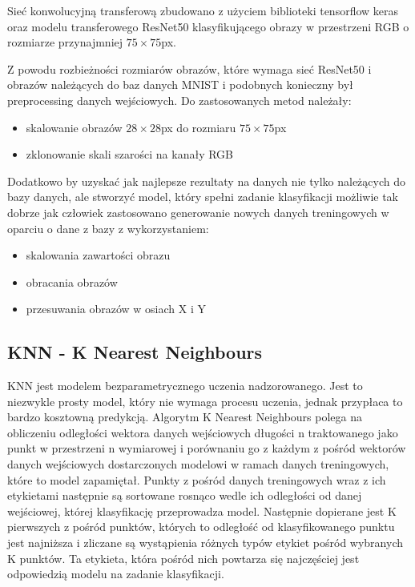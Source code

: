 \documentclass{article}
\begin{document}
Sieć konwolucyjną transferową zbudowano z użyciem biblioteki tensorflow 
keras oraz modelu transferowego ResNet50 klasyfikującego obrazy w 
przestrzeni RGB o rozmiarze przynajmniej $75\times75$px.

Z powodu rozbieżności rozmiarów obrazów, które wymaga sieć ResNet50 
i obrazów należących do baz danych MNIST i podobnych konieczny był 
preprocessing danych wejściowych. Do zastosowanych metod należały:

\begin{itemize}
\item skalowanie obrazów $28\times28$px do rozmiaru $75\times75$px
\item zklonowanie skali szarości na kanały RGB 
\end{itemize}

Dodatkowo by uzyskać jak najlepsze rezultaty na danych nie tylko 
należących do bazy danych, ale stworzyć model, który spełni zadanie 
klasyfikacji możliwie tak dobrze jak człowiek zastosowano 
generowanie nowych danych treningowych w oparciu o dane z bazy z wykorzystaniem:

\begin{itemize}
\item skalowania zawartości obrazu
\item obracania obrazów
\item przesuwania obrazów w osiach X i Y
\end{itemize}


\subsection{KNN - K Nearest Neighbours}
KNN jest modelem bezparametrycznego uczenia nadzorowanego. Jest to niezwykle prosty model,
 który nie wymaga procesu uczenia, jednak przypłaca to bardzo kosztowną predykcją.
Algorytm K Nearest Neighbours polega na obliczeniu odległości wektora danych wejściowych 
długości n traktowanego jako punkt w przestrzeni n wymiarowej i porównaniu go z każdym z 
pośród wektorów danych wejściowych dostarczonych modelowi w ramach danych treningowych, 
które to model zapamiętał. Punkty z pośród danych treningowych wraz z ich etykietami 
następnie są sortowane rosnąco wedle ich odległości od danej wejściowej, której 
klasyfikację przeprowadza model. Następnie dopierane jest K pierwszych z pośród 
punktów, których to odległość od klasyfikowanego punktu jest najniższa i zliczane 
są wystąpienia różnych typów etykiet pośród wybranych K punktów. Ta etykieta, 
która pośród nich powtarza się najczęściej jest odpowiedzią modelu na zadanie klasyfikacji.
\end{document}
